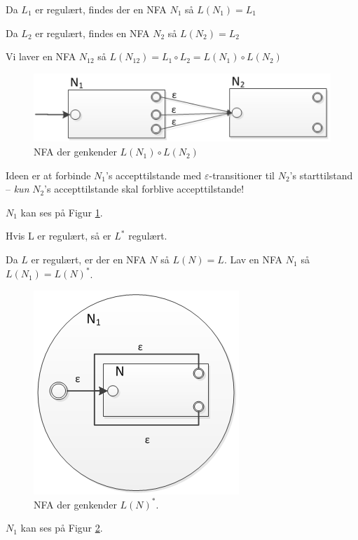 \documentclass[a4paper,10pt,article]{memoir}
\begin{document}
\begin{bevis}

Da $L_1$ er regulært, findes der en NFA $N_1$ så $L(N_1) = L_1$

Da $L_2$ er regulært, findes en NFA $N_2$ så $L(N_2) = L_2$

Vi laver en NFA $N_12$ så $L(N_12) = L_1 \circ L_2 = L(N_1) \circ L(N_2)$

\begin{figure}[h]
\centering
\includegraphics[scale=0.8]{figur10.png}
\caption{NFA der genkender $ L(N_1) \circ L(N_2)$}
\label{fig:10}
\end{figure}

Ideen er at forbinde $N_1$'s accepttilstande med $\varepsilon$-transitioner til $N_2$'s starttilstand -- \emph{kun} $N_2$'s accepttilstande skal forblive accepttilstande!

$N_1$ kan ses på Figur \ref{fig:10}.

\end{bevis}

\begin{saetning}
Hvis L er regulært, så er $L^{\ast}$ regulært.
\end{saetning}

\begin{bevis}
Da $L$ er regulært, er der en NFA $N$ så $L(N) = L$. Lav en NFA $N_1$ så $L(N_1) = L(N)^{\ast}$.

\begin{figure}[h]
\centering
\includegraphics[scale=0.8]{figur11.png}
\caption{NFA der genkender $L(N)^{\ast}$.}
\label{fig:11}
\end{figure}

$N_1$ kan ses på Figur \ref{fig:11}.
\end{bevis}
\end{document}
